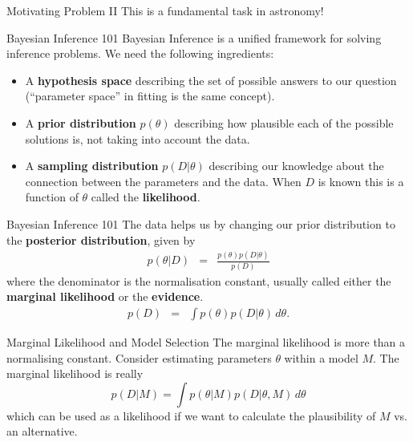 \begin{frame}[t]{Motivating Problem II}
This is a fundamental task in astronomy!
\end{frame}


\begin{frame}[t]{Bayesian Inference 101}
Bayesian Inference is a unified framework for solving inference problems.
We need the following ingredients:

\begin{itemize}
\setlength{\itemsep}{20pt}
\item A {\bf hypothesis space} describing the set of possible answers to our
question (``parameter space'' in fitting is the same concept).
\item A {\bf prior distribution} $p(\theta)$ describing how plausible
each of the possible solutions is, not taking into account the data.
\item A {\bf sampling distribution} $p(D | \theta)$ describing our knowledge
about the connection between the parameters and the data. When $D$ is known
this is a function of $\theta$ called the {\bf likelihood}.
\end{itemize}

\end{frame}


\begin{frame}[t]{Bayesian Inference 101}
The data helps us by changing our prior distribution to the {\bf posterior
distribution}, given by
\begin{eqnarray}
p(\theta | D) &=& \frac{p(\theta) p(D|\theta)}{p(D)}
\end{eqnarray}
where the denominator is the normalisation constant, usually called either
the {\bf marginal likelihood} or the {\bf evidence}.
\begin{eqnarray}
p(D) &=& \int p(\theta)p(D|\theta) \, d\theta.
\end{eqnarray}

\end{frame}

\begin{frame}[t]{Marginal Likelihood and Model Selection}
The marginal likelihood is more than a normalising constant. Consider
estimating parameters $\theta$ within a model $M$. The marginal likelihood
is really
\begin{equation}
p(D|M) = \int p(\theta | M)p(D|\theta, M) \, d\theta
\end{equation}
which can
be used as a likelihood if we want to calculate the plausibility of $M$ vs.
an alternative.
\end{frame}


